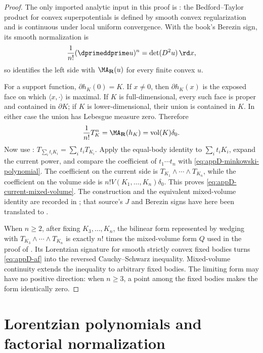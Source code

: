 \begin{proof}
The only imported analytic input in this proof is
\cite[Theorem~4.2]{Ber26Convex}: the Bedford--Taylor product for convex
superpotentials is defined by smooth convex regularization and is continuous
under local uniform convergence.  With the book's
Berezin sign, its smooth normalization is
\[
       \frac1{n!}(\dprimeddprime u)^n
       =\det(D^2u)\,\rd x,
\]
so  identifies the left side with
\(\MA_{\mathbf R}(u)\) for every finite convex \(u\).

For a support function,
\(\partial h_K(0)=K\).  If \(x\neq0\), then \(\partial h_K(x)\) is the
exposed face on which \(\langle x,\cdot\rangle\) is maximal.  If \(K\)
is full-dimensional, every such face is proper and contained in
\(\partial K\); if \(K\) is lower-dimensional, their union is contained
in \(K\).  In either case the union has Lebesgue measure zero.  Therefore
\[
               \frac1{n!}T_K^n
               =\MA_{\mathbf R}(h_K)
               =\operatorname{vol}(K)\delta_0.
\]
Now use :
\(T_{\sum_i t_iK_i}=\sum_i t_iT_{K_i}\).  Apply the equal-body identity
to \(\sum_i t_iK_i\), expand the current power, and compare the coefficient
of \(t_1\cdots t_n\) with
\eqref{eq:appD-minkowski-polynomial}.  The coefficient on the current side
is \(T_{K_1}\wedge\cdots\wedge T_{K_n}\), while the coefficient on the
volume side is \(n!V(K_1,\ldots,K_n)\delta_0\).  This proves
\eqref{eq:appD-current-mixed-volume}.  The construction and the equivalent
mixed-volume identity are recorded in
\cite[Sections~5--7]{Ber26Convex}; that source's \(J\) and Berezin signs
have here been translated to
.

When \(n\geq2\), after fixing \(K_3,\ldots,K_n\), the bilinear form represented by wedging
with \(T_{K_3}\wedge\cdots\wedge T_{K_n}\) is exactly \(n!\) times the
mixed-volume form \(Q\) used in the proof of .
Its Lorentzian signature for smooth strictly convex fixed bodies turns
\eqref{eq:appD-af} into the reversed Cauchy--Schwarz inequality.  Mixed-volume
continuity extends the inequality to arbitrary fixed bodies.  The limiting
form may have no positive direction: when \(n\geq3\), a point among the
fixed bodies makes the form identically zero.
\end{proof}

\section{Lorentzian polynomials and factorial normalization}
\label{sec:appD-Lorentzian-normalization}

